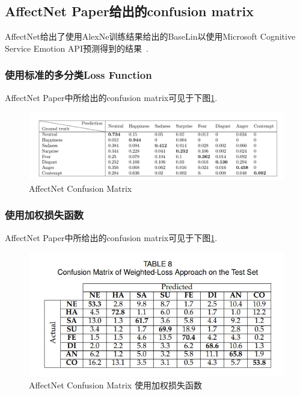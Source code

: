\documentclass[11pt, a4paper]{article}
\begin{document}
\begin{CJK}{UTF8}{gbsn}
\subsection{AffectNet Paper给出的confusion matrix}

AffectNet给出了使用AlexNe训练结果给出的BaseLin以使用Microsoft Cognitive Service Emotion API预测得到的结果~\cite{ref:affnet}.


\subsubsection{使用标准的多分类Loss Function}
AffectNet Paper中所给出的confusion matrix可见于下图\ref{fig:bn_cm}.

\begin{figure}[htbp]
	\centering %
	
	\includegraphics[width=16cm]{bn_cm}
	\caption{AffectNet Confusion Matrix}
	\label{fig:bn_cm}
\end{figure}

\subsubsection{使用加权损失函数}

AffectNet Paper中所给出的confusion matrix可见于下图\ref{fig:bn_cm}.

\begin{figure}[htbp]
	\centering %
	
	\includegraphics[width=16cm]{bn_cm2}
	\caption{AffectNet Confusion Matrix 使用加权损失函数}
	\label{fig:bn_cm2}
\end{figure}


\end{CJK}
\end{document}
